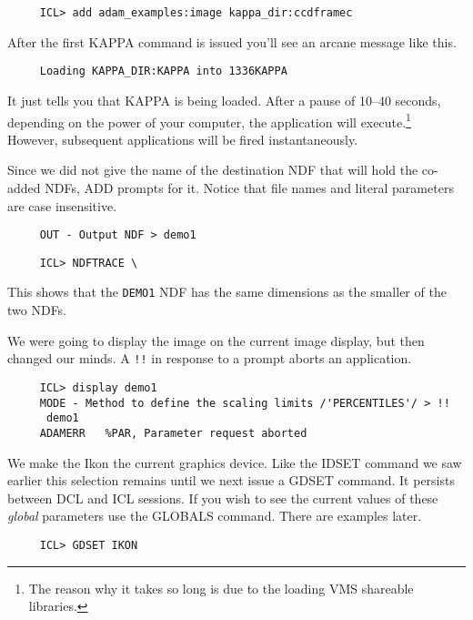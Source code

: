 \small
\begin{verbatim}
     ICL> add adam_examples:image kappa_dir:ccdframec
\end{verbatim}
\normalsize

After the first {\small KAPPA} command is issued you'll see an arcane
message like this.

\small
\begin{verbatim}
     Loading KAPPA_DIR:KAPPA into 1336KAPPA
\end{verbatim}
\normalsize

It just tells you that {\small KAPPA} is being loaded.  After a pause of
10--40 seconds, depending on the power of your computer, the application
will execute.\footnote{The reason why it takes so long is due to the
loading VMS shareable libraries.} However, subsequent applications will be
fired instantaneously.

Since we did not give the name of the destination NDF that will hold the
co-added NDFs, ADD prompts for it.  Notice that file names and
literal parameters are case insensitive.

\small
\begin{verbatim}
     OUT - Output NDF > demo1
\end{verbatim}
\normalsize

\small
\begin{verbatim}
     ICL> NDFTRACE \
\end{verbatim}
\normalsize

This shows that the {\tt DEMO1} NDF has the same dimensions as the
smaller of the two NDFs.

We were going to display the image on the current image display, but
then changed our minds.  A {\tt !!} in response to a prompt aborts an
application.

\small
\begin{verbatim}
     ICL> display demo1
     MODE - Method to define the scaling limits /'PERCENTILES'/ > !!
      demo1
     ADAMERR   %PAR, Parameter request aborted
\end{verbatim}
\normalsize

We make the Ikon the current graphics device.  Like the IDSET command
we saw earlier this selection remains until we next issue a GDSET
command.  It persists between {\small DCL} and {\small ICL} sessions.
If you wish to see the current values of these {\em global} parameters
use the GLOBALS command.  There are examples later.

\small
\begin{verbatim}
     ICL> GDSET IKON
\end{verbatim}
\normalsize

